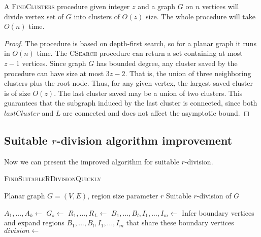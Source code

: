 \begin{lemma}
A \textsc{FindClusters} procedure given integer $z$ and a graph $G$ on $n$ vertices will divide vertex set of $G$ into clusters of $O(z)$ size. The whole procedure will take $O(n)$ time.
\end{lemma}

\begin{proof}
The procedure is based on depth-first search, so for a planar graph it runs in $O(n)$ time. The \textsc{CSearch} procedure can return a set containing at most $z - 1$ vertices. Since graph $G$ has bounded degree, any cluster saved by the procedure can have size at most $3z - 2$. That is, the union of three neighboring clusters plus the root node. Thus, for any given vertex, the largest saved cluster is of size $O(z)$. The last cluster saved may be a union of two clusters. This guarantees that the subgraph induced by the last cluster is connected, since both $lastCluster$ and $L$ are connected and does not affect the asymptotic bound.
\end{proof}

\subsection{Suitable $r$-division algorithm improvement}

Now we can present the improved algorithm for suitable $r$-division.

\begin{algorithm}
\caption{\textsc{FindSuitableRDivisionQuickly}}\label{findSuitable}
\begin{algorithmic}[1]
\Require Planar graph $G=(V,E)$, region size parameter $r$
\Ensure Suitable $r$-division of $G$

\State ${A_1,...,A_k} \gets$ 
\State $G_s \gets$ 
\State ${R_1, ..., R_L} \gets$  \Statex {}
\State ${B_1,...,B_l,I_1,..., I_m} \gets $  \Statex {}
\State Infer boundary vertices and expand regions ${B_1,...,B_l,I_1,..., I_m}$ that share these boundary vertices
\State $division \gets$  \Statex {}
\State {}
\end{algorithmic}
\end{algorithm}


